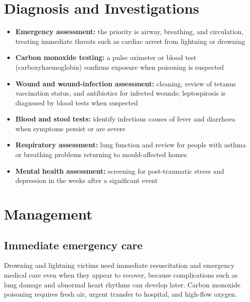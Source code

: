 \section*{Diagnosis and Investigations}
\begin{itemize}
    \item \textbf{Emergency assessment:} the priority is airway, breathing, and circulation, treating immediate threats such as cardiac arrest from lightning or drowning
    \item \textbf{Carbon monoxide testing:} a pulse oximeter or blood test (carboxyhaemoglobin) confirms exposure when poisoning is suspected
    \item \textbf{Wound and wound-infection assessment:} cleaning, review of tetanus vaccination status, and antibiotics for infected wounds; leptospirosis is diagnosed by blood tests when suspected
    \item \textbf{Blood and stool tests:} identify infectious causes of fever and diarrhoea when symptoms persist or are severe
    \item \textbf{Respiratory assessment:} lung function and review for people with asthma or breathing problems returning to mould-affected homes
    \item \textbf{Mental health assessment:} screening for post-traumatic stress and depression in the weeks after a significant event
\end{itemize}

\section*{Management}
\subsection*{Immediate emergency care}
Drowning and lightning victims need immediate resuscitation and emergency medical care even when they appear to recover, because complications such as lung damage and abnormal heart rhythms can develop later. Carbon monoxide poisoning requires fresh air, urgent transfer to hospital, and high-flow oxygen.

